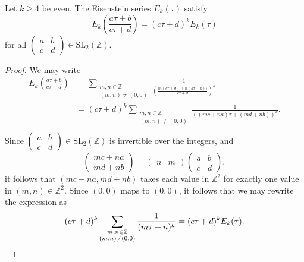 \documentclass[10pt,a4paper]{amsart}
\begin{document}
\begin{prop}\label{prop: modular}
    Let $k\ge 4$ be even. The Eisenstein series $E_k(\tau)$ satisfy 
    \[E_k\left(\frac{a\tau+b}{c\tau + d}\right) =(c\tau + d)^k E_k(\tau)\]
    for all $\begin{pmatrix}a & b \\ c & d\end{pmatrix}\in \mathrm{SL}_2(\mathbb Z)$.
\end{prop}

\begin{proof}
    We may write
    \begin{align*}
        E_k\left(\frac{a\tau+b}{c\tau + d}\right) &= \sum_{\substack{m,n\in \mathbb Z\\ (m,n)\ne (0,0)}} \frac{1}{\left(\frac{m(c\tau + d) + n(a\tau + b))}{c\tau + d}\right)^k}\\
        &=(c\tau + d)^k\sum_{\substack{m,n\in \mathbb Z\\ (m,n)\ne (0,0)}} \frac{1}{((mc+na)\tau + (md + nb))^{k}}.\\
    \end{align*}
    Since $\begin{pmatrix}
        a & b\\ c & d
    \end{pmatrix}\in \mathrm{SL}_2(\mathbb Z)$ is invertible over the integers, and
    \[\begin{pmatrix}
        mc+na \\
        md + nb
    \end{pmatrix} = \begin{pmatrix}
        n & m
    \end{pmatrix}\begin{pmatrix}
         a & b \\
         c & d
    \end{pmatrix},\]
    it follows that $(mc+na, md+nb)$ takes each value in $\mathbb Z^2$ for exactly one value in $(m,n)\in \mathbb Z^2$. Since $(0,0)$ maps to $(0,0)$, it follows that we may rewrite the expression as
    \[(c\tau + d)^k \sum_{\substack{m,n\in \mathbb Z\\(m,n)\ne (0,0)}} \frac{1}{(m\tau + n)^k}  = (c\tau + d)^k E_k(\tau).\qedhere\]
\end{proof}
\end{document}
